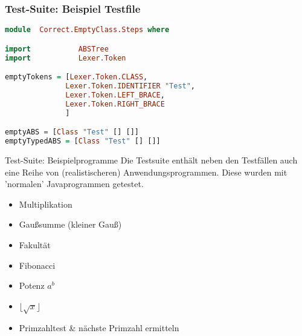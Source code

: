 \begin{frame}[fragile]
\frametitle{Test-Suite: Beispiel Testfile}
\begin{lstlisting}[language=Haskell]
module  Correct.EmptyClass.Steps where

import           ABSTree
import           Lexer.Token

emptyTokens = [Lexer.Token.CLASS,
              Lexer.Token.IDENTIFIER "Test",
              Lexer.Token.LEFT_BRACE,
              Lexer.Token.RIGHT_BRACE
              ]

emptyABS = [Class "Test" [] []]
emptyTypedABS = [Class "Test" [] []]	
\end{lstlisting}
	
\end{frame}

\begin{frame}{Test-Suite: Beispielprogramme}
Die Testsuite enthält neben den Testfällen auch eine Reihe von (realistischeren) Anwendungsprogrammen. Diese wurden mit 'normalen' Javaprogrammen getestet.

\pause

\begin{itemize}
	\item Multiplikation \pause 
	\item Gaußsumme (kleiner Gauß) \pause
	\item Fakultät \pause
	\item Fibonacci \pause
	\item Potenz $a^b$ \pause 
	\item $\lfloor \sqrt{x} \rfloor$ \pause
	\item Primzahltest \& nächste Primzahl ermitteln
\end{itemize}	
\end{frame}


